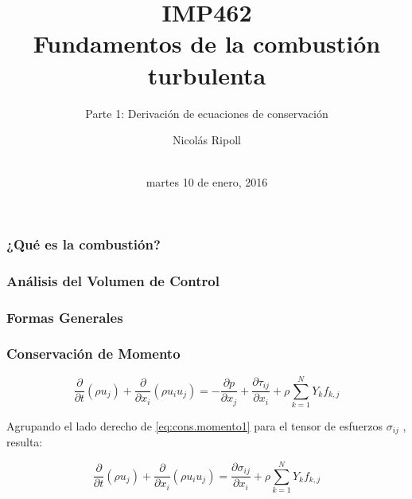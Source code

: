 \documentclass[11pt]{beamer}
\author{Nicolás Ripoll} %
\title{IMP462 \\ Fundamentos de la combustión turbulenta}
\subtitle{Parte 1: Derivación de ecuaciones de conservación}
\institute{Departamento de Ingeniería Mecánica \\Universidad Técnica Federico Santa María}
\date{\\ martes 10 de enero, 2016}
\begin{document}
	\maketitle
	
	\begin{frame}
		\frametitle{¿Qué es la combustión?}
	\end{frame}

	\begin{frame}
		\frametitle{Análisis del Volumen de Control}
	\end{frame}
	
	\begin{frame}
		\frametitle{Formas Generales}
	\end{frame}
	
	\begin{frame}
		\frametitle{Conservación de Momento}
	
	
		\begin{equation} %
			\dfrac{\partial}{\partial t} \left(\rho u_{j}\right) + \dfrac{\partial}{\partial x_{i}} \left(\rho u_{i} u_{j}\right) = -\dfrac{\partial p}{\partial x_{j}} + \dfrac{\partial \tau_{i j}}{\partial x_{i}} + \rho \sum_{k=1}^{N} Y_{k} f_{k,j}
			\label{eq:cons.momento1}
		\end{equation}

		Agrupando el lado derecho de \eqref{eq:cons.momento1} para el tensor de esfuerzos $\sigma_{i j}$ , resulta:

		\begin{equation} %
			\dfrac{\partial}{\partial t} \left(\rho u_{j}\right) + \dfrac{\partial}{\partial x_{i}} \left(\rho u_{i} u_{j}\right) = \dfrac{\partial \sigma_{i j}}{\partial x_{i}} + \rho \sum_{k=1}^{N} Y_{k} f_{k,j}
			\label{eq:cons.momento2}
		\end{equation}
		
	\end{frame}
	


\end{document}
